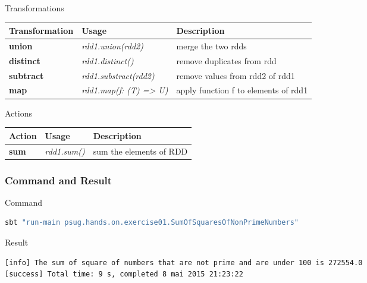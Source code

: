 \documentclass[slidetop,9pt,utf8]{beamer}
\begin{document}
\begin{CJK}{UTF8}{gbsn}
\begin{frame}
  \begin{block}{Transformations}
    \begin{center}
      \begin{tabular}{|m{2.1cm}|m{3.5cm}|m{5cm}|}
        \hline 
        \rowcolor{gray} \textbf{Transformation} & \textbf{Usage} & \textbf{Description} \\ \hline
        \textbf{union} & \textit{rdd1.union(rdd2)} & merge the two rdds \\ \hline
        \textbf{distinct} & \textit{rdd1.distinct()} & remove duplicates from rdd \\ \hline
        \textbf{subtract} & \textit{rdd1.substract(rdd2)} & remove values from rdd2 of rdd1 \\ \hline
        \textbf{map} & \textit{rdd1.map(f: (T) =\textgreater\xspace U)} & apply function f to elements of rdd1 \\ \hline
      \end{tabular}
    \end{center}
  \end{block}

  \begin{block}{Actions}
    \begin{center}
      \begin{tabular}{|m{2.1cm}|m{3.5cm}|m{5cm}|}
        \hline 
        \rowcolor{gray} \textbf{Action} & \textbf{Usage} & \textbf{Description} \\ \hline
        \textbf{sum} & \textit{rdd1.sum()} & sum the elements of RDD \\ \hline
      \end{tabular}
    \end{center}
  \end{block}

\end{frame}

\begin{frame}[fragile]
  \frametitle{Command and Result}

  \begin{block}{Command}
    \begin{lstlisting}[language=bash, style=terminal]
sbt "run-main psug.hands.on.exercise01.SumOfSquaresOfNonPrimeNumbers"
    \end{lstlisting}
  \end{block}

  \begin{block}{Result}
    \begin{lstlisting}[language=bash, style=terminal]
[info] The sum of square of numbers that are not prime and are under 100 is 272554.0
[success] Total time: 9 s, completed 8 mai 2015 21:23:22
    \end{lstlisting}
  \end{block}


\end{frame}
\end{CJK}
\end{document}
